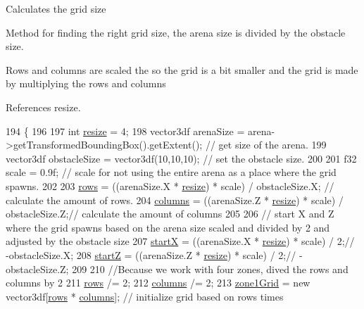 Calculates the grid size 

Method for finding the right grid size, the arena size is divided by the obstacle size. 



 

 Rows and columns are scaled the so the grid is a bit smaller and the grid is made by multiplying the rows and columns 

References resize.


\begin{DoxyCode}
194 \{
196 
197     \textcolor{keywordtype}{int} \hyperlink{_enemy_spawner_8cpp_a23cc32f539e1b8c74174c581008b5546}{resize} = 4;
198     vector3df arenaSize = arena->getTransformedBoundingBox().getExtent(); \textcolor{comment}{// get size of the arena.}
199     vector3df obstacleSize = vector3df(10,10,10); \textcolor{comment}{// set the obstacle size.}
200 
201     f32 scale = 0.9f; \textcolor{comment}{// scale for not using the entire arena as a place where the grid spawns.}
202 
203     \hyperlink{class_object_placement_generation_a9de1ce3954d2a5aff10af4e88bb26516}{rows} = ((arenaSize.X * \hyperlink{_enemy_spawner_8cpp_a23cc32f539e1b8c74174c581008b5546}{resize}) * scale) / obstacleSize.X; \textcolor{comment}{// calculate the amount of rows.}
204     \hyperlink{class_object_placement_generation_a872cbf261b7aac7c6f9c570b56d92acd}{columns} = ((arenaSize.Z * \hyperlink{_enemy_spawner_8cpp_a23cc32f539e1b8c74174c581008b5546}{resize}) * scale) / obstacleSize.Z;\textcolor{comment}{// calculate the amount of
       columns}
205 
206     \textcolor{comment}{// start X and Z where the grid spawns based on the arena size scaled and divided by 2 and adjusted by
       the obstacle size}
207     \hyperlink{class_object_placement_generation_a265fa21c083b78b5c98410436ff33d72}{startX} = ((arenaSize.X * \hyperlink{_enemy_spawner_8cpp_a23cc32f539e1b8c74174c581008b5546}{resize}) * scale) / 2;\textcolor{comment}{// -obstacleSize.X;}
208     \hyperlink{class_object_placement_generation_aa0632a6f68c075e03d6a8c6551f53e4c}{startZ} = ((arenaSize.Z * \hyperlink{_enemy_spawner_8cpp_a23cc32f539e1b8c74174c581008b5546}{resize}) * scale) / 2;\textcolor{comment}{// -obstacleSize.Z;}
209 
210     \textcolor{comment}{//Because we work with four zones, dived the rows and columns by 2}
211     \hyperlink{class_object_placement_generation_a9de1ce3954d2a5aff10af4e88bb26516}{rows} /= 2;
212     \hyperlink{class_object_placement_generation_a872cbf261b7aac7c6f9c570b56d92acd}{columns} /= 2;
213     \hyperlink{class_object_placement_generation_aad1c9c2a56afd002bb8b551232292d65}{zone1Grid} = \textcolor{keyword}{new} vector3df[\hyperlink{class_object_placement_generation_a9de1ce3954d2a5aff10af4e88bb26516}{rows} * \hyperlink{class_object_placement_generation_a872cbf261b7aac7c6f9c570b56d92acd}{columns}]; \textcolor{comment}{// initialize grid based on rows times
}
\end{DoxyCode}
